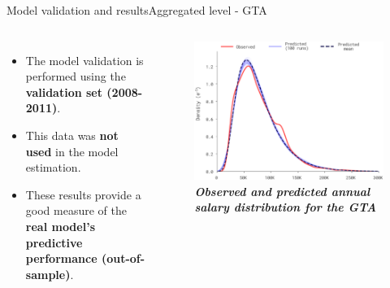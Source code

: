 \documentclass[aspectratio=169, xcolor=dvipsnames]{beamer}
\begin{document}
\begin{frame}{Model validation and results}{Aggregated level - GTA}
    \vspace*{-20pt}
    \begin{columns}
            \begin{itemize}
                \item \fontsize{10pt}{12pt}\selectfont The model validation is performed using the \textbf{validation set (2008-2011)}.
                \item \fontsize{10pt}{12pt}\selectfont This data was \textbf{not used} in the model estimation.
                \item \fontsize{10pt}{12pt}\selectfont These results provide a good measure of the \textbf{real model's predictive performance (out-of-sample)}.
            \end{itemize}
            \begin{figure}
                \centering
                \includegraphics[width=1.0\textwidth]{./images/salary.png}
                \captionsetup{labelformat=empty}
                \setlength{\abovecaptionskip}{-10pt}
                \caption{\fontsize{8pt}{8pt}\selectfont \textbf{\textit{Observed and predicted annual salary distribution for the GTA}}}
            \end{figure}
    \end{columns}
\end{frame}
\end{document}
